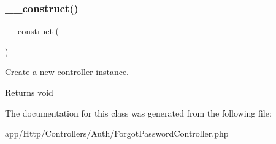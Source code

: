 \subsubsection{\texorpdfstring{\_\_construct()}{\_\_construct()}}
{\footnotesize\ttfamily \+\_\+\+\_\+construct (\begin{DoxyParamCaption}{ }\end{DoxyParamCaption})}

Create a new controller instance.

\begin{DoxyReturn}{Returns}
void 
\end{DoxyReturn}


The documentation for this class was generated from the following file\+:\begin{DoxyCompactItemize}
\item 
app/\+Http/\+Controllers/\+Auth/Forgot\+Password\+Controller.\+php\end{DoxyCompactItemize}
